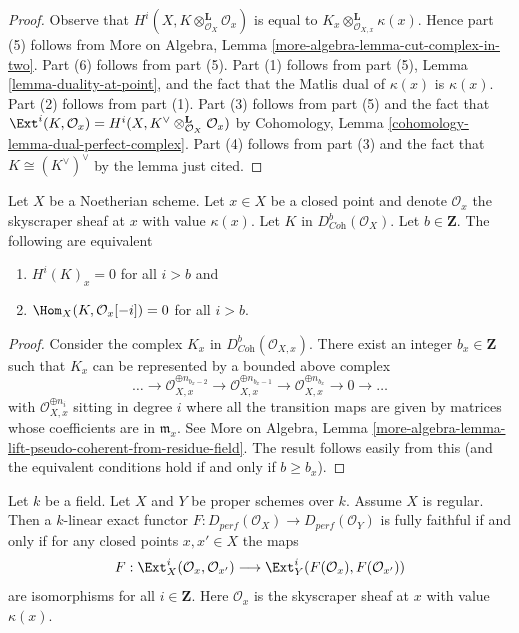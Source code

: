 \begin{proof}
Observe that $H^i(X, K \otimes_{\mathcal{O}_X}^\mathbf{L} \mathcal{O}_x)$
is equal to $K_x  \otimes_{\mathcal{O}_{X, x}}^\mathbf{L} \kappa(x)$.
Hence part (5) follows from More on Algebra, Lemma
\ref{more-algebra-lemma-cut-complex-in-two}.
Part (6) follows from part (5).
Part (1) follows from part (5), Lemma \ref{lemma-duality-at-point}, and the
fact that the Matlis dual of $\kappa(x)$ is $\kappa(x)$.
Part (2) follows from part (1).
Part (3) follows from part (5) and the fact that
$\Ext^i(K, \mathcal{O}_x) =
H^i(X, K^\vee \otimes_{\mathcal{O}_X}^\mathbf{L} \mathcal{O}_x)$ by
Cohomology, Lemma \ref{cohomology-lemma-dual-perfect-complex}.
Part (4) follows from part (3) and the fact that $K \cong (K^\vee)^\vee$
by the lemma just cited.
\end{proof}

\begin{lemma}
\label{lemma-hom-into-point-sheaf}
Let $X$ be a Noetherian scheme. Let $x \in X$ be a closed point and
denote $\mathcal{O}_x$ the skyscraper sheaf at $x$ with value $\kappa(x)$.
Let $K$ in $D^b_{\textit{Coh}}(\mathcal{O}_X)$. Let $b \in \mathbf{Z}$.
The following are equivalent
\begin{enumerate}
\item $H^i(K)_x = 0$ for all $i > b$ and
\item $\Hom_X(K, \mathcal{O}_x[-i]) = 0$ for all $i > b$.
\end{enumerate}
\end{lemma}

\begin{proof}
Consider the complex $K_x$ in $D^b_{\textit{Coh}}(\mathcal{O}_{X, x})$.
There exist an integer $b_x \in \mathbf{Z}$ such that $K_x$
can be represented by a bounded above complex
$$
\ldots \to
\mathcal{O}_{X, x}^{\oplus n_{b_x - 2}} \to
\mathcal{O}_{X, x}^{\oplus n_{b_x - 1}} \to
\mathcal{O}_{X, x}^{\oplus n_{b_x}} \to 0 \to \ldots
$$
with $\mathcal{O}_{X, x}^{\oplus n_i}$ sitting in degree $i$
where all the transition maps are given by matrices whose
coefficients are in $\mathfrak m_x$. See
More on Algebra, Lemma
\ref{more-algebra-lemma-lift-pseudo-coherent-from-residue-field}.
The result follows easily from this (and the equivalent
conditions hold if and only if $b \geq b_x$).
\end{proof}

\begin{lemma}
\label{lemma-get-fully-faithful-geometric}
Let $k$ be a field. Let $X$ and $Y$ be proper schemes over $k$.
Assume $X$ is regular. Then a $k$-linear exact functor
$F : D_{perf}(\mathcal{O}_X) \to D_{perf}(\mathcal{O}_Y)$
is fully faithful if and only if
for any closed points $x, x' \in X$ the maps
$$
F : \Ext^i_X(\mathcal{O}_x, \mathcal{O}_{x'})
\longrightarrow
\Ext^i_Y(F(\mathcal{O}_x), F(\mathcal{O}_{x'}))
$$
are isomorphisms for all $i \in \mathbf{Z}$.
Here $\mathcal{O}_x$ is the skyscraper sheaf at $x$ with value $\kappa(x)$.
\end{lemma}

